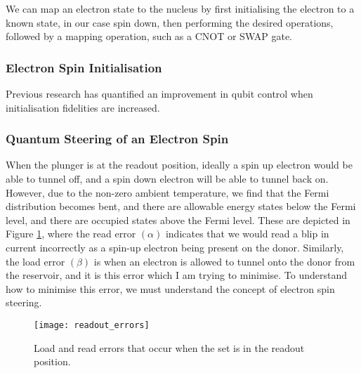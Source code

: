 		We can map an electron state to the nucleus by first initialising the electron to a known state, in our case spin down, then performing the desired operations, followed by a mapping operation, such as a CNOT or SWAP gate.
		
	
	\subsubsection{Electron Spin Initialisation}
	Previous research \cite{rachpon_thesis} has quantified an improvement in qubit control when initialisation fidelities are increased.
	
	
	\subsubsection{Quantum Steering of an Electron Spin}
	
	When the plunger is at the readout position, ideally a spin up electron would be able to tunnel off, and a spin down electron will be able to tunnel back on. However, due to the non-zero ambient temperature, we find that the Fermi distribution becomes bent, and there are allowable energy states below the Fermi level, and there are occupied states above the Fermi level. These are depicted in Figure \ref{fig::errors}, where the read error $(\alpha)$ indicates that we would read a blip in current incorrectly as a spin-up electron being present on the donor. Similarly, the load error $(\beta)$ is when an electron is allowed to tunnel onto the donor from the reservoir, and it is this error which I am trying to minimise. To understand how to minimise this error, we must understand the concept of electron spin steering.
	
	\begin{figure}[htbp!]
		\centering
		\texttt{[image: readout\_errors]}
		\caption[Load and red errors in the \gls{set} readout position]{Load and read errors that occur when the \gls{set} is in the readout position.\cite{electron_spin_silicon}}
		\label{fig::errors}
	\end{figure}
	
